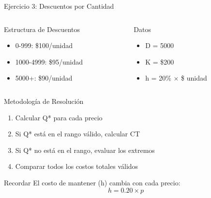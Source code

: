 \documentclass{beamer}
\begin{document}
\begin{frame}{Ejercicio 3: Descuentos por Cantidad}
    \begin{columns}[T]
        \begin{column}{0.6\textwidth}
            \begin{block}{Estructura de Descuentos}
                \begin{itemize}
                    \item 0-999: \$100/unidad
                    \item 1000-4999: \$95/unidad
                    \item 5000+: \$90/unidad
                \end{itemize}
            \end{block}
        \end{column}
        \begin{column}{0.4\textwidth}
            \begin{block}{Datos}
                \begin{itemize}
                    \item D = 5000
                    \item K = \$200
                    \item h = 20\% × \$ unidad
                \end{itemize}
            \end{block}
        \end{column}
    \end{columns}
\end{frame}


\begin{frame}{Metodología de Resolución}
    \begin{enumerate}
        \item Calcular Q* para cada precio
        \item Si Q* está en el rango válido, calcular CT
        \item Si Q* no está en el rango, evaluar los extremos
        \item Comparar todos los costos totales válidos
    \end{enumerate}
    \pause
    \begin{alertblock}{Recordar}
        El costo de mantener (h) cambia con cada precio:
        \[ h = 0.20 \times p \]
    \end{alertblock}
\end{frame}
\end{document}
